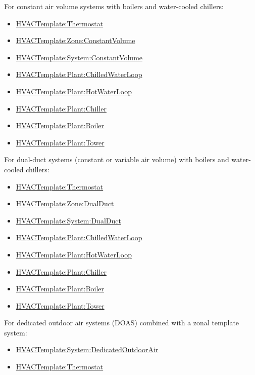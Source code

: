 For constant air volume systems with boilers and water-cooled chillers:

\begin{itemize}
\item
  \hyperref[hvactemplatethermostat]{HVACTemplate:Thermostat}
\item
  \hyperref[hvactemplatezoneconstantvolume]{HVACTemplate:Zone:ConstantVolume}
\item
  \hyperref[hvactemplatesystemconstantvolume]{HVACTemplate:System:ConstantVolume}
\item
  \hyperref[hvactemplateplantchilledwaterloop]{HVACTemplate:Plant:ChilledWaterLoop}
\item
  \hyperref[hvactemplateplanthotwaterloop]{HVACTemplate:Plant:HotWaterLoop}
\item
  \hyperref[hvactemplateplantchiller]{HVACTemplate:Plant:Chiller}
\item
  \hyperref[hvactemplateplantboiler]{HVACTemplate:Plant:Boiler}
\item
  \hyperref[hvactemplateplanttower]{HVACTemplate:Plant:Tower}
\end{itemize}

For dual-duct systems (constant or variable air volume) with boilers and water-cooled chillers:

\begin{itemize}
\item
  \hyperref[hvactemplatethermostat]{HVACTemplate:Thermostat}
\item
  \hyperref[hvactemplatezonedualduct]{HVACTemplate:Zone:DualDuct}
\item
  \hyperref[hvactemplatesystemdualduct]{HVACTemplate:System:DualDuct}
\item
  \hyperref[hvactemplateplantchilledwaterloop]{HVACTemplate:Plant:ChilledWaterLoop}
\item
  \hyperref[hvactemplateplanthotwaterloop]{HVACTemplate:Plant:HotWaterLoop}
\item
  \hyperref[hvactemplateplantchiller]{HVACTemplate:Plant:Chiller}
\item
  \hyperref[hvactemplateplantboiler]{HVACTemplate:Plant:Boiler}
\item
  \hyperref[hvactemplateplanttower]{HVACTemplate:Plant:Tower}
\end{itemize}

For dedicated outdoor air systems (DOAS) combined with a zonal template system:

\begin{itemize}
\item
  \hyperref[hvactemplatesystemdedicatedoutdoorair]{HVACTemplate:System:DedicatedOutdoorAir}
\item
  \hyperref[hvactemplatethermostat]{HVACTemplate:Thermostat}
\end{itemize}

